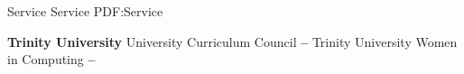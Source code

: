 \Section
{Service}
{Service}
{PDF:Service}

\Entry
\textbf{Trinity University}
\Gap
University Curriculum Council
\dotfill
\textbf{ -- }
\Gap
Trinity University Women in Computing
\dotfill
\textbf{ -- }